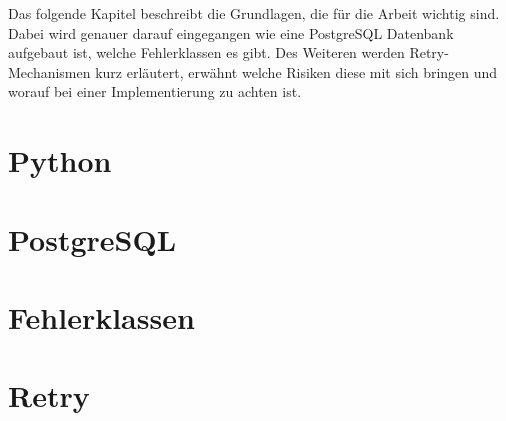 
Das folgende Kapitel beschreibt die Grundlagen, die für die Arbeit wichtig sind.
Dabei wird genauer darauf eingegangen wie eine PostgreSQL Datenbank aufgebaut ist, welche Fehlerklassen es gibt.
Des Weiteren werden Retry-Mechanismen kurz erläutert, erwähnt welche Risiken diese mit sich bringen und worauf
bei einer Implementierung zu achten ist.

\section{Python}
\label{sec:python}


\section{PostgreSQL}
\label{sec:postgresql}


\section{Fehlerklassen}
\label{sec:errorclasses}


\section{Retry}
\label{sec:retry}
